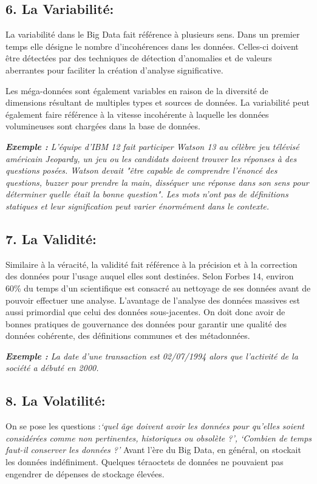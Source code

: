 \subsection*{6. La Variabilité:}
La variabilité dans le Big Data fait référence à plusieurs sens. Dans un premier temps elle désigne le nombre d'incohérences dans les données. Celles-ci doivent être détectées par des techniques de détection d'anomalies et de valeurs aberrantes pour faciliter la création d'analyse significative. 

Les méga-données sont également variables en raison de la diversité de dimensions résultant de multiples types et sources de données. La variabilité peut également faire référence à la vitesse incohérente à laquelle les données volumineuses sont chargées dans la base de données.

\textit{\textbf{Exemple :} L'équipe d'IBM 12 fait participer Watson 13 au célèbre jeu télévisé américain Jeopardy, un jeu ou les candidats doivent trouver les réponses à des questions posées. Watson devait "être capable de comprendre l'énoncé des questions, buzzer pour prendre la main, disséquer une réponse dans son sens pour déterminer quelle était la bonne question". Les mots n'ont pas de définitions statiques et leur signification peut varier énormément dans le contexte.}

\subsection*{7. La Validité:}
Similaire à la véracité, la validité fait référence à la précision et à la correction des données pour l'usage auquel elles sont destinées. Selon Forbes 14, environ 60\% du temps d'un scientifique est consacré au nettoyage de ses données avant de pouvoir effectuer une analyse. L'avantage de l'analyse des données massives est aussi primordial que celui des données sous-jacentes. On doit donc avoir de bonnes pratiques de gouvernance des données pour garantir une qualité des données cohérente, des définitions communes et des métadonnées.

\textit{\textbf{Exemple :} La date d'une transaction est  02/07/1994 alors que l'activité de la société a débuté en 2000.}

\subsection*{8. La Volatilité:}
On se pose les questions :\textit{‘quel âge doivent avoir les données pour qu'elles soient considérées comme non pertinentes, historiques ou obsolète ?’,  ‘Combien de temps faut-il conserver les données ?’} Avant l'ère du Big Data, en général, on stockait les données indéfiniment. Quelques téraoctets de données ne pouvaient pas engendrer de dépenses de stockage élevées. 

